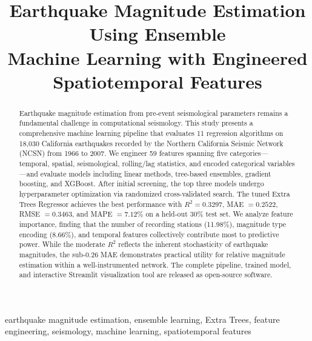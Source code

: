 \documentclass[journal,10pt,twocolumn]{IEEEtran}
\begin{document}
\title{Earthquake Magnitude Estimation Using Ensemble\\Machine Learning with Engineered Spatiotemporal Features}

\author{
}

\maketitle

\begin{abstract}
Earthquake magnitude estimation from pre-event seismological parameters remains a fundamental challenge in computational seismology. This study presents a comprehensive machine learning pipeline that evaluates 11 regression algorithms on 18,030 California earthquakes recorded by the Northern California Seismic Network (NCSN) from 1966 to 2007. We engineer 59 features spanning five categories—temporal, spatial, seismological, rolling/lag statistics, and encoded categorical variables—and evaluate models including linear methods, tree-based ensembles, gradient boosting, and XGBoost. After initial screening, the top three models undergo hyperparameter optimization via randomized cross-validated search. The tuned Extra Trees Regressor achieves the best performance with $R^2 = 0.3297$, MAE $= 0.2522$, RMSE $= 0.3463$, and MAPE $= 7.12\%$ on a held-out 30\% test set. We analyze feature importance, finding that the number of recording stations (11.98\%), magnitude type encoding (8.66\%), and temporal features collectively contribute most to predictive power. While the moderate $R^2$ reflects the inherent stochasticity of earthquake magnitudes, the sub-0.26 MAE demonstrates practical utility for relative magnitude estimation within a well-instrumented network. The complete pipeline, trained model, and interactive Streamlit visualization tool are released as open-source software.
\end{abstract}

\begin{IEEEkeywords}
earthquake magnitude estimation, ensemble learning, Extra Trees, feature engineering, seismology, machine learning, spatiotemporal features
\end{IEEEkeywords}
\end{document}

